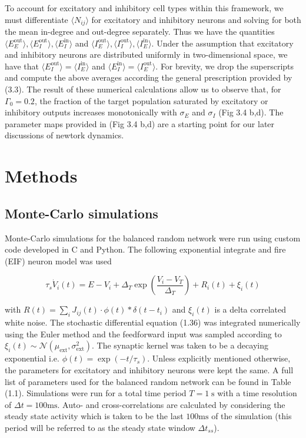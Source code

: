 \documentclass{ucetd}
\begin{document}
To account for excitatory and inhibitory cell types within this framework, we must differentiate $\langle N_{ij}\rangle$ for excitatory and inhibitory neurons and solving for both the mean in-degree and out-degree separately. Thus we have the quantities $\langle E_{E}^{\mathrm{out}} \rangle,\langle E_{I}^{\mathrm{out}} \rangle,\langle E_{I}^{\mathrm{in}} \rangle$ and $\langle I_{E}^{\mathrm{out}} \rangle,\langle I_{I}^{\mathrm{out}} \rangle,\langle I_{E}^{\mathrm{in}} \rangle$. Under the assumption that excitatory and inhibitory neurons are distributed uniformly  in two-dimensional space, we have that $\langle E_{I}^{\mathrm{out}} \rangle = \langle I_{E}^{\mathrm{in}} \rangle$ and $\langle E_{I}^{\mathrm{in}} \rangle = \langle I_{E}^{\mathrm{out}}\rangle$. For brevity, we drop the superscripts and compute the above averages according the general prescription provided by (3.3). The result of these numerical calculations allow us to observe that, for $\Gamma_{0} = 0.2$, the fraction of the target population saturated by excitatory or inhibitory outputs increases monotonically with $\sigma_{E}$ and $\sigma_{I}$  (Fig 3.4 b,d). The parameter maps provided in (Fig 3.4 b,d) are a starting point for our later discussions of newtork dynamics.


\section{Methods}

\subsection{Monte-Carlo simulations}

Monte-Carlo simulations for the balanced random network were run using custom code developed in C and Python. The following exponential integrate and fire (EIF) neuron model was used

\begin{equation}
\tau_{s}\dot{V}_{i}(t) = E - V_{i} + \Delta_{T}\exp\left(\frac{V_{i}-V_{T}}{\Delta_{T}}\right) + R_{i}(t) + \xi_{i}(t)
\end{equation}

with $R(t) = \sum_{i} J_{ij}(t)\cdot \phi(t) * \delta(t-t_{i})$ and $\xi_{i}(t)$ is a delta correlated white noise. The stochastic differential equation (1.36) was integrated numerically using the Euler method and the feedforward input was sampled according to $\xi_{i}(t) \sim \mathcal{N}(\mu_{\mathrm{ext}},\sigma_{\mathrm{ext}}^{2})$. The synaptic kernel was taken to be a decaying exponential i.e. $\phi(t) = \exp(-t/\tau_{s})$. Unless explicitly mentioned otherwise, the parameters for excitatory and inhibitory neurons were kept the same. A full list of parameters used for the balanced random network can be found in Table (1.1). Simulations were run for a total time period $T = 1 \;\mathrm{s}$ with a time resolution of $\Delta t = 100\mathrm{ms}$. Auto- and cross-correlations are calculated by considering the steady state activity which is taken to be the last $100\mathrm{ms}$ of the simulation (this period will be referred to as the steady state window $\Delta t_{ss}$).
\end{document}
